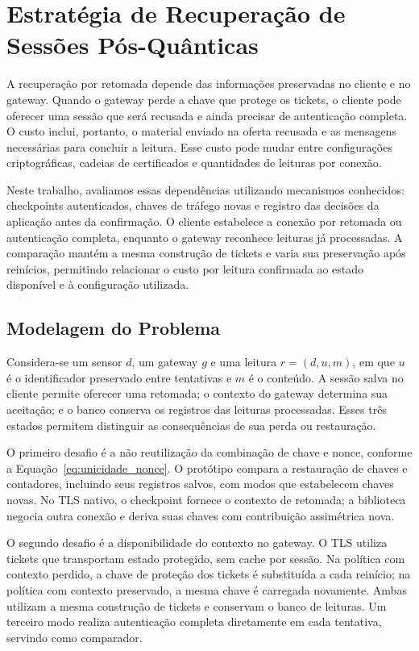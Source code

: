 \section{Estratégia de Recuperação de Sessões Pós-Quânticas}
\label{sec:proposta}

A recuperação por retomada depende das informações preservadas no cliente e no gateway. Quando o gateway perde a chave que protege os tickets, o cliente pode oferecer uma sessão que será recusada e ainda precisar de autenticação completa. O custo inclui, portanto, o material enviado na oferta recusada e as mensagens necessárias para concluir a leitura. Esse custo pode mudar entre configurações criptográficas, cadeias de certificados e quantidades de leituras por conexão.

Neste trabalho, avaliamos essas dependências utilizando mecanismos conhecidos: checkpoints autenticados, chaves de tráfego novas e registro das decisões da aplicação antes da confirmação. O cliente estabelece a conexão por retomada ou autenticação completa, enquanto o gateway reconhece leituras já processadas. A comparação mantém a mesma construção de tickets e varia sua preservação após reinícios, permitindo relacionar o custo por leitura confirmada ao estado disponível e à configuração utilizada.

\subsection{Modelagem do Problema}
\label{sec:modelagem}

Considera-se um sensor \(d\), um gateway \(g\) e uma leitura \(r=(d,u,m)\), em que \(u\) é o identificador preservado entre tentativas e \(m\) é o conteúdo. A sessão salva no cliente permite oferecer uma retomada; o contexto do gateway determina sua aceitação; e o banco conserva os registros das leituras processadas. Esses três estados permitem distinguir as consequências de sua perda ou restauração.

O primeiro desafio é a não reutilização da combinação de chave e nonce, conforme a Equação~\ref{eq:unicidade_nonce}. O protótipo compara a restauração de chaves e contadores, incluindo seus registros salvos, com modos que estabelecem chaves novas. No TLS nativo, o checkpoint fornece o contexto de retomada; a biblioteca negocia outra conexão e deriva suas chaves com contribuição assimétrica nova.

O segundo desafio é a disponibilidade do contexto no gateway. O TLS utiliza tickets que transportam estado protegido, sem cache por sessão. Na política com contexto perdido, a chave de proteção dos tickets é substituída a cada reinício; na política com contexto preservado, a mesma chave é carregada novamente. Ambas utilizam a mesma construção de tickets e conservam o banco de leituras. Um terceiro modo realiza autenticação completa diretamente em cada tentativa, servindo como comparador.

